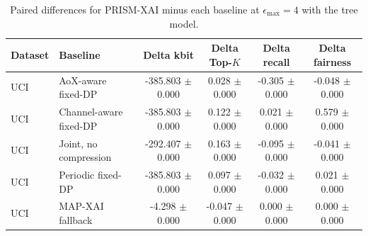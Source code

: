 \begin{table}[t]
\caption{Paired differences for PRISM-XAI minus each baseline at $\epsilon_{\max}=4$ with the tree model.}
\label{tab:paired-differences}
\centering
\scriptsize
\setlength{\tabcolsep}{3pt}
\begin{tabular}{llcccc}
\toprule
Dataset & Baseline & Delta kbit & Delta Top-$K$ & Delta recall & Delta fairness \\
\midrule
UCI & AoX-aware fixed-DP & -385.803 $\pm$ 0.000 & 0.028 $\pm$ 0.000 & -0.305 $\pm$ 0.000 & -0.048 $\pm$ 0.000 \\
UCI & Channel-aware fixed-DP & -385.803 $\pm$ 0.000 & 0.122 $\pm$ 0.000 & 0.021 $\pm$ 0.000 & 0.579 $\pm$ 0.000 \\
UCI & Joint, no compression & -292.407 $\pm$ 0.000 & 0.163 $\pm$ 0.000 & -0.095 $\pm$ 0.000 & -0.041 $\pm$ 0.000 \\
UCI & Periodic fixed-DP & -385.803 $\pm$ 0.000 & 0.097 $\pm$ 0.000 & -0.032 $\pm$ 0.000 & 0.021 $\pm$ 0.000 \\
UCI & MAP-XAI fallback & -4.298 $\pm$ 0.000 & -0.047 $\pm$ 0.000 & 0.000 $\pm$ 0.000 & 0.000 $\pm$ 0.000 \\
\bottomrule
\end{tabular}
\end{table}
